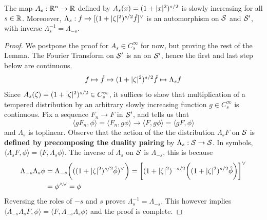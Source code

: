 \documentclass[../main-v2-manifolds.tex]{subfiles}
\begin{document}
\begin{lemma}\label{lem:multiplication sobolev factor automorphism}
The map $A_s: {\mathbb{R}^n}\to\mathbb{R}$ defined by $A_s(x) = (1+\vert {x} \vert^2)^{s/2}$ is slowly increasing for all $s\in\mathbb{R}$. Moreoever, $\Lambda_s: f\mapsto [(1+\vert {\zeta} \vert^2)^{s/2}\hat{f}]^{\vee}$ is an automorphism on $\mathcal{S}$ and $\mathcal{S}'$, with inverse $\Lambda_s^{-1} = \Lambda_{-s}$.
\end{lemma}
\begin{proof}
    We postpone the proof for $A_s\in C_s^\infty$ for now, but proving the rest of the Lemma. The Fourier Transform on $\mathcal{S}'$ is an on $\mathcal{S}'$, hence the first and last step below are continuous. 
    \[
    f\mapsto \hat{f}\mapsto (1+\vert {\zeta} \vert^2)^{s/2} \hat{f} \mapsto \Lambda_s f
    \]
    Since $A_s(\zeta) = (1+\vert {\zeta} \vert^2)^{s/2}\in C_s^\infty$, it suffices to show that multiplication of a tempered distribution by an arbitrary slowly increasing function $g\in C_s^\infty$ is continuous. Fix a sequence $F_n\to F$ in $\mathcal{S}'$, and  tells us that
    \[
    \langle g F_n,\phi\rangle = \langle F_n, g\phi\rangle\longrightarrow \langle F,g\phi\rangle = \langle g F,\phi\rangle
    \]
    and $\Lambda_s$ is toplinear. Observe that the action of the the distribution $\Lambda_s F$ on $\mathcal{S}$ is \textbf{defined by precomposing the duality pairing} by $\Lambda_s: \mathcal{S}\to\mathcal{S}$. In symbols, $\langle \Lambda_s F,\phi\rangle = \langle F,\Lambda_s\phi\rangle$. The inverse of $\Lambda_s$ on $\mathcal{S}$ is $\Lambda_{-s}$, this is because
    \begin{align*}
    \Lambda_{-s}\Lambda_s\phi &= \Lambda_{-s}\biggl(((1+\vert {\zeta} \vert^2)^{s/2}\hat{\phi})^{\vee}\biggr)= \biggl[(1+\vert {\zeta} \vert^2)^{-s/2}\biggl((1+\vert {\zeta} \vert^2)^{s/2}\hat{\phi}\biggr)\biggr]^{\vee}\\
    &= \phi^{\wedge\vee}= \phi
    \end{align*}
    Reversing the roles of $-s$ and $s$ proves $\Lambda_s^{-1} = \Lambda_{-s}$. This however implies $\langle\Lambda_{-s}\Lambda_{s}F,\phi\rangle = \langle F,\Lambda_{-s}\Lambda_{s}\phi\rangle$ and the proof is complete.
\end{proof}
\end{document}
